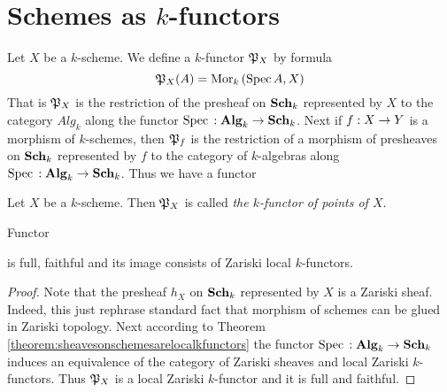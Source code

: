 \section{Schemes as $k$-functors}
\noindent
Let $X$ be a $k$-scheme. We define a $k$-functor ${\mathfrak P}_X$ by formula
$${\mathfrak P}_X(A) = \mathrm{Mor}_k\left(\mathrm{Spec}\, A,X\right)$$
That is ${\mathfrak P}_X$ is the restriction of the presheaf on $\mathbf{Sch}_k$ represented by $X$ to the category $Alg_k$ along the functor $\mathrm{Spec}\,:\mathbf{Alg}_k\rightarrow \mathbf{Sch}_k$. Next if $f:X\rightarrow Y$ is a morphism of $k$-schemes, then ${\mathfrak P}_f$ is the restriction of a morphism of presheaves on $\mathbf{Sch}_k$ represented by $f$ to the category of $k$-algebras along $\mathrm{Spec}\,:\mathbf{Alg}_k\rightarrow \mathbf{Sch}_k$. Thus we have a functor
\begin{center}
\end{center}

\begin{definition}
Let $X$ be a $k$-scheme. Then ${\mathfrak P}_X$ is called \textit{the $k$-functor of points of $X$}.
\end{definition}

\begin{fact}\label{fact:functorsofpoints}
Functor
\begin{center}
\end{center}
is full, faithful and its image consists of Zariski local $k$-functors.
\end{fact}
\begin{proof}
Note that the presheaf $h_X$ on $\mathbf{Sch}_k$ represented by $X$ is a Zariski sheaf. Indeed, this just rephrase standard fact that morphism of schemes can be glued in Zariski topology. Next according to Theorem \ref{theorem:sheavesonschemesarelocalkfunctors} the functor $\mathrm{Spec}\,:\mathbf{Alg}_k\rightarrow \mathbf{Sch}_k$ induces an equivalence of the category of Zariski sheaves and local Zariski $k$-functors. Thus ${\mathfrak P}_X$ is a local Zariski $k$-functor and it is full and faithful.
\end{proof}

